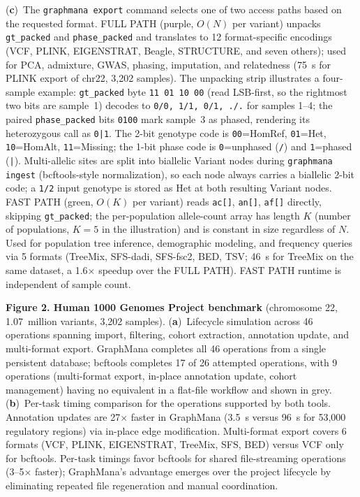\documentclass[pdflatex,sn-nature]{sn-jnl}
\begin{document}
(\textbf{c})~The \texttt{graphmana export} command selects one of two access paths based on the requested format. FULL PATH (purple, $O(N)$ per variant) unpacks \texttt{gt\_packed} and \texttt{phase\_packed} and translates to 12 format-specific encodings (VCF, PLINK, EIGENSTRAT, Beagle, STRUCTURE, and seven others); used for PCA, admixture, GWAS, phasing, imputation, and relatedness (75~s for PLINK export of chr22, 3,202 samples). The unpacking strip illustrates a four-sample example: \texttt{gt\_packed} byte \texttt{11~01~10~00} (read LSB-first, so the rightmost two bits are sample~1) decodes to \texttt{0/0, 1/1, 0/1, ./.} for samples 1--4; the paired \texttt{phase\_packed} bits \texttt{0100} mark sample~3 as phased, rendering its heterozygous call as \texttt{0|1}. The 2-bit genotype code is \texttt{00}=HomRef, \texttt{01}=Het, \texttt{10}=HomAlt, \texttt{11}=Missing; the 1-bit phase code is \texttt{0}=unphased (\texttt{/}) and \texttt{1}=phased (\texttt{|}). Multi-allelic sites are split into biallelic Variant nodes during \texttt{graphmana ingest} (bcftools-style normalization), so each node always carries a biallelic 2-bit code; a \texttt{1/2} input genotype is stored as Het at both resulting Variant nodes. FAST PATH (green, $O(K)$ per variant) reads \texttt{ac[]}, \texttt{an[]}, \texttt{af[]} directly, skipping \texttt{gt\_packed}; the per-population allele-count array has length $K$ (number of populations, $K{=}5$ in the illustration) and is constant in size regardless of $N$. Used for population tree inference, demographic modeling, and frequency queries via 5 formats (TreeMix, SFS-dadi, SFS-fsc2, BED, TSV; 46~s for TreeMix on the same dataset, a 1.6$\times$ speedup over the FULL PATH). FAST PATH runtime is independent of sample count.

\vspace{1em}

\noindent\textbf{Figure 2. Human 1000 Genomes Project benchmark} (chromosome 22, 1.07~million variants, 3,202 samples).
(\textbf{a})~Lifecycle simulation across 46 operations spanning import, filtering, cohort extraction, annotation update, and multi-format export. GraphMana completes all 46 operations from a single persistent database; bcftools completes 17 of 26 attempted operations, with 9 operations (multi-format export, in-place annotation update, cohort management) having no equivalent in a flat-file workflow and shown in grey.
(\textbf{b})~Per-task timing comparison for the operations supported by both tools. Annotation updates are 27$\times$ faster in GraphMana (3.5~s versus 96~s for 53,000 regulatory regions) via in-place edge modification. Multi-format export covers 6 formats (VCF, PLINK, EIGENSTRAT, TreeMix, SFS, BED) versus VCF only for bcftools. Per-task timings favor bcftools for shared file-streaming operations (3--5$\times$ faster); GraphMana's advantage emerges over the project lifecycle by eliminating repeated file regeneration and manual coordination.
\end{document}

